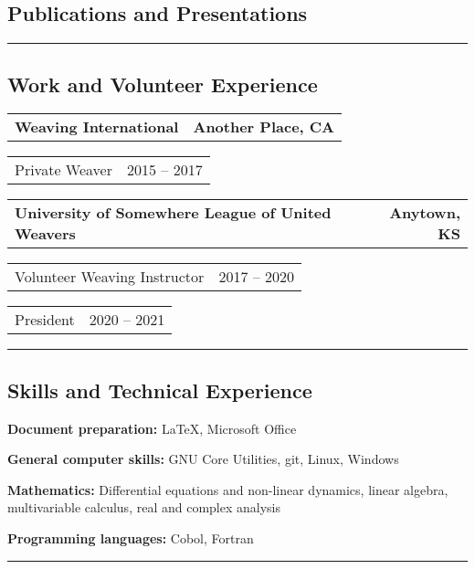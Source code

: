 \documentclass[10pt,letterpaper]{article}
\makeatletter
\newlength{\step}
\newlength{\twostep}
\newlength{\aligngroupinlen}
\newcommand{\aligngroup}[2]
{\begin{tabular*}{\linewidth}{@{}l@{\extracolsep{\fill}}r@{}}
		#1 &
		#2 \\
\end{tabular*}}
\newcommand{\aligngroupin}[2]
{\setlength{\aligngroupinlen}{\linewidth}\addtolength{\aligngroupinlen}{-\step}\hspace*{\step}\begin{tabular*}{\aligngroupinlen}{@{}l@{\extracolsep{\fill}}r@{}}
		#1 &
		#2 \\
\end{tabular*}}
\newenvironment{indentsection}%
	{\begin{list}%
			{}%
			{\setlength{\leftmargin}{\step}%
			 \setlength{\parsep}{\parskip}%
			 \setlength{\itemsep}{0pt}%
			}%
			\item[]%
	}%
	{\end{list}}%
\newenvironment{hangingpar}%
	{\begin{list}%
			{}%
			{\setlength{\itemindent}{-\step}%
			 \setlength{\leftmargin}{\twostep}%
			 \setlength{\itemsep}{0pt}%
			 \setlength{\parsep}{\parskip}%
			 }%
			\setlength{\parindent}{-\step}%
			\item[]%
	}%
	{\end{list}
	 \vspace{0.25em}}%
\makeatother
\begin{document}
\subsection*{Publications and Presentations}

\begin{hangingpar}

	
\end{hangingpar}
\hrule
\subsection*{Work and Volunteer Experience}
\begin{indentsection}
	\aligngroup
		{\textbf{Weaving International}}
		{\textbf{Another Place, CA}}
	\aligngroupin
		{Private Weaver}
		{2015 -- 2017}
	\aligngroup
		{\textbf{University of Somewhere League of United Weavers}}
		{\textbf{Anytown, KS}}
	\aligngroupin
		{Volunteer Weaving Instructor}
		{2017 -- 2020}
	\aligngroupin
		{President}
		{2020 -- 2021}
\end{indentsection}
\hrule
\subsection*{Skills and Technical Experience}
\begin{hangingpar}
	\textbf{Document preparation:} \LaTeX{}, Microsoft Office
		
	\textbf{General computer skills:} GNU Core Utilities, git, Linux, Windows

	\textbf{Mathematics:} Differential equations and non-linear dynamics, linear algebra, multivariable calculus, real and complex analysis

	\textbf{Programming languages:} Cobol, Fortran
\end{hangingpar}
\hrule
\end{document}
